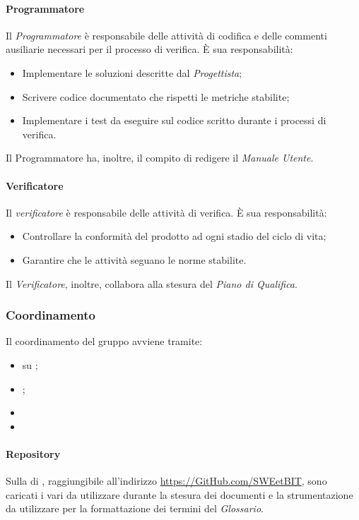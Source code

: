         \paragraph{Programmatore}
          Il \emph{Programmatore} è responsabile delle attività di codifica e delle commenti ausiliarie necessari per il processo di verifica.
          È sua responsabilità:
          \begin{itemize}
            \item Implementare le soluzioni descritte dal \emph{Progettista};
            \item Scrivere codice documentato che rispetti le metriche stabilite;
            \item Implementare i test da eseguire sul codice scritto durante i processi di verifica.
          \end{itemize}
          Il Programmatore ha, inoltre, il compito di redigere il \emph{Manuale Utente}.
        \paragraph{Verificatore}
          Il \emph{verificatore} è responsabile delle attività di verifica.
          È sua responsabilità:
          \begin{itemize}
            \item Controllare la conformità del prodotto ad ogni stadio del ciclo di vita;
            \item Garantire  che le attività seguano le norme stabilite.
          \end{itemize}
          Il \emph{Verificatore}, inoltre, collabora alla stesura del \emph{Piano di Qualifica}.
   
\subsubsection{Coordinamento}
    Il coordinamento del gruppo avviene tramite:
    \begin{itemize}
      \item {} su \textbf{};
      \item {};
      \item {}
      \item {}
    \end{itemize}
    \paragraph{Repository}
      Sulla  di \textbf{}, raggiungibile all'indirizzo \url{https://GitHub.com/SWEetBIT}, sono caricati i vari  da utilizzare
      durante la stesura dei documenti e la strumentazione da utilizzare per la formattazione dei termini del \emph{Glossario}.

